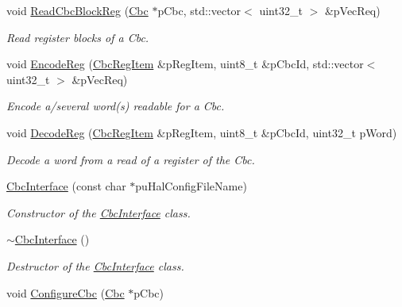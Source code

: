 \begin{DoxyCompactItemize}
void \hyperlink{class_ph2___hw_interface_1_1_cbc_interface_ac9ec0a962f0527a8298c1771240bf838}{Read\-Cbc\-Block\-Reg} (\hyperlink{class_ph2___hw_description_1_1_cbc}{Cbc} $\ast$p\-Cbc, std\-::vector$<$ uint32\-\_\-t $>$ \&p\-Vec\-Req)
\begin{DoxyCompactList}\small\item\em Read register blocks of a Cbc. \end{DoxyCompactList}\item 
void \hyperlink{class_ph2___hw_interface_1_1_cbc_interface_a2718fb251129aef788f6068c53dd1b44}{Encode\-Reg} (\hyperlink{struct_ph2___hw_description_1_1_cbc_reg_item}{Cbc\-Reg\-Item} \&p\-Reg\-Item, uint8\-\_\-t \&p\-Cbc\-Id, std\-::vector$<$ uint32\-\_\-t $>$ \&p\-Vec\-Req)
\begin{DoxyCompactList}\small\item\em Encode a/several word(s) readable for a Cbc. \end{DoxyCompactList}\item 
void \hyperlink{class_ph2___hw_interface_1_1_cbc_interface_acf2c23c04d1f48b3d1ad875d63e6b98e}{Decode\-Reg} (\hyperlink{struct_ph2___hw_description_1_1_cbc_reg_item}{Cbc\-Reg\-Item} \&p\-Reg\-Item, uint8\-\_\-t \&p\-Cbc\-Id, uint32\-\_\-t p\-Word)
\begin{DoxyCompactList}\small\item\em Decode a word from a read of a register of the Cbc. \end{DoxyCompactList}\item 
\hyperlink{class_ph2___hw_interface_1_1_cbc_interface_a3ddefe5549da06a7d26fee1502a792b4}{Cbc\-Interface} (const char $\ast$pu\-Hal\-Config\-File\-Name)
\begin{DoxyCompactList}\small\item\em Constructor of the \hyperlink{class_ph2___hw_interface_1_1_cbc_interface}{Cbc\-Interface} class. \end{DoxyCompactList}\item 
\hyperlink{class_ph2___hw_interface_1_1_cbc_interface_a1f0ab7d7cf7783a0fe275e8e1d7e5a49}{$\sim$\-Cbc\-Interface} ()
\begin{DoxyCompactList}\small\item\em Destructor of the \hyperlink{class_ph2___hw_interface_1_1_cbc_interface}{Cbc\-Interface} class. \end{DoxyCompactList}\item 
void \hyperlink{class_ph2___hw_interface_1_1_cbc_interface_a0567c7a31f70f446202e60d037c869ea}{Configure\-Cbc} (\hyperlink{class_ph2___hw_description_1_1_cbc}{Cbc} $\ast$p\-Cbc)

\end{DoxyCompactItemize}
